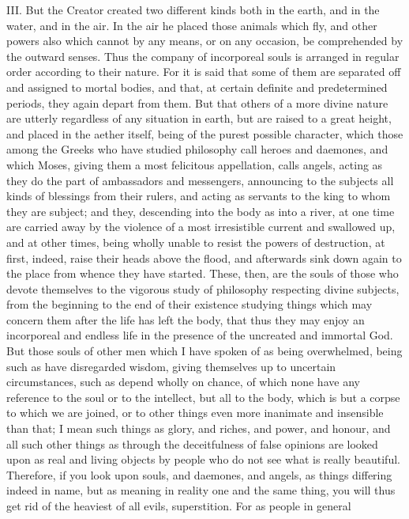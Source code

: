 III. But the Creator created two different kinds both in the earth, and in the water, and in the air. In
the air he placed those animals which fly, and other powers also which cannot by any means, or on
any occasion, be comprehended by the outward senses. Thus the company of incorporeal souls is
arranged in regular order according to their nature. For it is said that some of them are separated
off and assigned to mortal bodies, and that, at certain definite and predetermined periods, they
again depart from them. But that others of a more divine nature are utterly regardless of any
situation in earth, but are raised to a great height, and placed in the aether itself, being of the
purest possible character, which those among the Greeks who have studied philosophy call heroes
and daemones, and which Moses, giving them a most felicitous appellation, calls angels, acting as
they do the part of ambassadors and messengers, announcing to the subjects all kinds of
blessings from their rulers, and acting as servants to the king to whom they are subject; and they,
descending into the body as into a river, at one time are carried away by the violence of a most
irresistible current and swallowed up, and at other times, being wholly unable to resist the powers of
destruction, at first, indeed, raise their heads above the flood, and afterwards sink down again to
the place from whence they have started. These, then, are the souls of those who devote
themselves to the vigorous study of philosophy respecting divine subjects, from the beginning to
the end of their existence studying things which may concern them after the life has left the body,
that thus they may enjoy an incorporeal and endless life in the presence of the uncreated and
immortal God. But those souls of other men which I have spoken of as being overwhelmed, being
such as have disregarded wisdom, giving themselves up to uncertain circumstances, such as
depend wholly on chance, of which none have any reference to the soul or to the intellect, but all to
the body, which is but a corpse to which we are joined, or to other things even more inanimate and
insensible than that; I mean such things as glory, and riches, and power, and honour, and all such
other things as through the deceitfulness of false opinions are looked upon as real and living
objects by people who do not see what is really beautiful. Therefore, if you look upon souls, and
daemones, and angels, as things differing indeed in name, but as meaning in reality one and the
same thing, you will thus get rid of the heaviest of all evils, superstition. For as people in general
